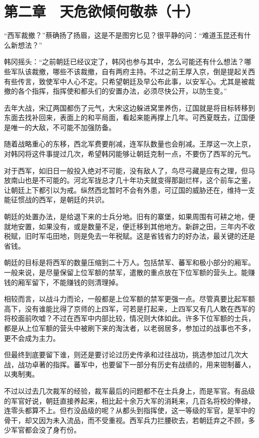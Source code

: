 \section{第二章　天危欲倾何敬恭（十）}

“西军裁撤？”蔡确扬了扬眉，这是不是图穷匕见？很平静的问：“难道玉昆还有什么新想法？”

韩冈摇头：“之前朝廷已经议定了，韩冈也参与其中，怎么可能还有什么想法？哪些军队该裁撤，哪些不该裁撤，自有两府主持。不过之前王厚入京，倒是提起关西有些传言，致使军中人心不定。只希望朝廷及早公布此事，以安军心。尤其是被裁撤的各个指挥，指挥使和都头们的安置办法，必须尽快公开，以防生变。”

去年大战，宋辽两国都伤了元气，大宋这边躲进窝里养伤，辽国就是将目标转移到东面去找补回来，表面上的和平局面，看起来能再撑上几年。可西夏既去，辽国便是唯一的大敌，不可能不加强防备。

随着战略重心的东移，西北军费要削减，连军队数量也会削减。王厚这一次上京，对韩冈将这件事提过几次，希望韩冈能够让朝廷克制一点，不要伤了西军的元气。

对于西军，如旧日一般投入绝对不可能，没有敌人了，鸟尽弓藏是应有之理，但马放南山也是不可能的。河北军拢总才几十年功夫就变得那副烂样，这个前车之鉴，让朝廷上下都引以为戒。纵然西北暂时不会有外患，可辽国的威胁还在，维持一支能征惯战的西军，是朝廷的共识。

朝廷的处置办法，是给退下来的士兵分地。旧有的寨堡，如果周围有可耕之地，便就地安置，如果没有，或是数量不足，便迁移到其他地方。新辟之田，三年内不收税赋，旧时军屯田地，则是免去一年税赋。这是省钱省力的好办法，最关键的还是省钱。

朝廷的目标是将西军的数量压缩到二十万人。包括禁军、蕃军和极小部分的厢军。一般来说，是尽量保留上位军额的禁军，遣散的重点放在下位军额的营头上。能赚钱的厢军留下，不能赚钱的则清理掉。

相较而言，以战斗力而论，一般都是上位军额的禁军更强一点。尽管真要比起军额高下，没有谁能比得了京师的上四军，可若是打起来，上四军又有几人敢在西军的将校面前吹嘘？不过在西军中内部比较，情况则大体如此。许多下位军额的士兵，都是从上位军额的营头中被刷下来的淘汰者，以老弱居多，参加过的战事也不多，更不会成为主力。

但最终到底要留下谁，则还是要讨论过历史传承和过往战功，挑选参加过几次大战，战功卓著的指挥。蕃军中，也要留下一部分有历史有战绩的，用来钳制蕃人，以夷制夷。

不过以过去几次裁军的经验，裁军最后的问题都不在士兵身上，而是军官。有品级的军官好说，朝廷直接养起来，相比起十余万大军的消耗来，几百名将校的俸禄，连零头都算不上。但冇没品级的呢？从都头到指挥使，这一等级的军官，是军中的骨干，却又因为未入流品，而不受重视。西军兵力拦腰砍去，若朝廷弃之不顾，多少军官都会没了身冇份。

